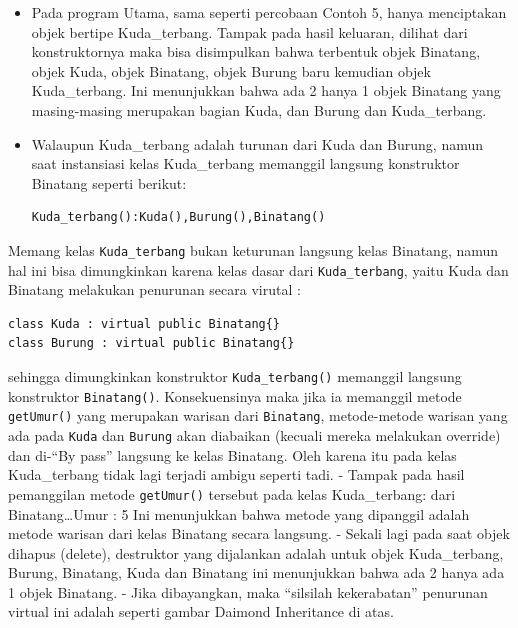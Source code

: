 \begin{itemize}
\item
  Pada program Utama, sama seperti percobaan Contoh 5, hanya menciptakan
  objek bertipe Kuda\_terbang. Tampak pada hasil keluaran, dilihat dari
  konstruktornya maka bisa disimpulkan bahwa terbentuk objek Binatang,
  objek Kuda, objek Binatang, objek Burung baru kemudian objek
  Kuda\_terbang. Ini menunjukkan bahwa ada 2 hanya 1 objek Binatang yang
  masing-masing merupakan bagian Kuda, dan Burung dan Kuda\_terbang.
\item
  Walaupun Kuda\_terbang adalah turunan dari Kuda dan Burung, namun saat
  instansiasi kelas Kuda\_terbang memanggil langsung konstruktor
  Binatang seperti berikut:

\begin{verbatim}
Kuda_terbang():Kuda(),Burung(),Binatang()
\end{verbatim}
\end{itemize}

Memang kelas \texttt{Kuda\_terbang} bukan keturunan langsung kelas
Binatang, namun hal ini bisa dimungkinkan karena kelas dasar dari
\texttt{Kuda\_terbang}, yaitu Kuda dan Binatang melakukan penurunan
secara virutal :

\begin{verbatim}
class Kuda : virtual public Binatang{}
class Burung : virtual public Binatang{}
\end{verbatim}

sehingga dimungkinkan konstruktor \texttt{Kuda\_terbang()} memanggil
langsung konstruktor \texttt{Binatang()}. Konsekuensinya maka jika ia
memanggil metode \texttt{getUmur()} yang merupakan warisan dari
\texttt{Binatang}, metode-metode warisan yang ada pada \texttt{Kuda} dan
\texttt{Burung} akan diabaikan (kecuali mereka melakukan override) dan
di-``By pass'' langsung ke kelas Binatang. Oleh karena itu pada kelas
Kuda\_terbang tidak lagi terjadi ambigu seperti tadi. - Tampak pada
hasil pemanggilan metode \texttt{getUmur()} tersebut pada kelas
Kuda\_terbang: dari Binatang\ldots{}Umur : 5 Ini menunjukkan bahwa
metode yang dipanggil adalah metode warisan dari kelas Binatang secara
langsung. - Sekali lagi pada saat objek dihapus (delete), destruktor
yang dijalankan adalah untuk objek Kuda\_terbang, Burung, Binatang, Kuda
dan Binatang ini menunjukkan bahwa ada 2 hanya ada 1 objek Binatang. -
Jika dibayangkan, maka ``silsilah kekerabatan'' penurunan virtual ini
adalah seperti gambar Daimond Inheritance di atas.

